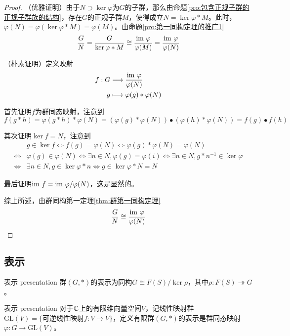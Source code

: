 \begin{proof}
	（优雅证明）由于$N\supset\ker\varphi$为$G$的子群，那么由命题\ref{pro:包含正规子群的正规子群族的结构}，存在$G$的正规子群$M$，使得成立$N=\ker\varphi*M$。此时，$\varphi(N)=\varphi(\ker\varphi*M)=\varphi(M)$。由命题\ref{pro:第一同构定理的推广1}
	$$
	\frac{G}{N}=\frac{G}{\ker\varphi*M}\cong\frac{\text{im } \varphi}{\varphi(M)}=\frac{\text{im } \varphi}{\varphi(N)}
	$$
	
	（朴素证明）定义映射
	\begin{align*}
		f:\begin{aligned}[t]
			G&\longrightarrow \frac{\text{im } \varphi}{\varphi(N)}\\
			g&\longmapsto \varphi(g)*\varphi(N)
		\end{aligned}
	\end{align*}
	
	首先证明$f$为群同态映射，注意到
	$$
	f(g*h)=\varphi(g*h)*\varphi(N)=(\varphi(g)*\varphi(N))\bullet (\varphi(h)*\varphi(N))=f(g)\bullet f(h)
	$$
	
	其次证明$\ker f=N$，注意到
	\begin{align*}
		&g\in\ker f
		\iff f(g)=\varphi(N)
		\iff \varphi(g)*\varphi(N)=\varphi(N)\\
		\iff &\varphi(g)\in\varphi(N)
		\iff \exists n\in N,\varphi(g)=\varphi(i)
		\iff \exists n\in N,g*n^{-1}\in\ker\varphi\\
		\iff&\exists n\in N,g\in\ker\varphi*n
		\iff g\in\ker\varphi*N=N
	\end{align*}
	
	最后证明$\text{im } f=\text{im } \varphi/\varphi(N)$，这是显然的。
	
	综上所述，由群同构第一定理\ref{thm:群第一同构定理}
	$$
	\frac{G}{N}\cong\frac{\text{im } \varphi}{\varphi(N)}
	$$
\end{proof}

\subsection{表示}

\begin{definition}{表示 presentation}
	群$(G,*)$的表示为同构$G\cong F(S)/\ker \rho$，其中$\rho:F(S)\twoheadrightarrow G$。
\end{definition}

\begin{definition}{表示 presentation}
	对于$\mathbb{C}$上的有限维向量空间$V$，记线性映射群$\mathrm{GL}(V)=\{ \text{可逆线性映射}f:V\to V  \}$，定义有限群$(G,*)$的表示是群同态映射$\varphi:G\to\mathrm{GL}(V)$。
\end{definition}

